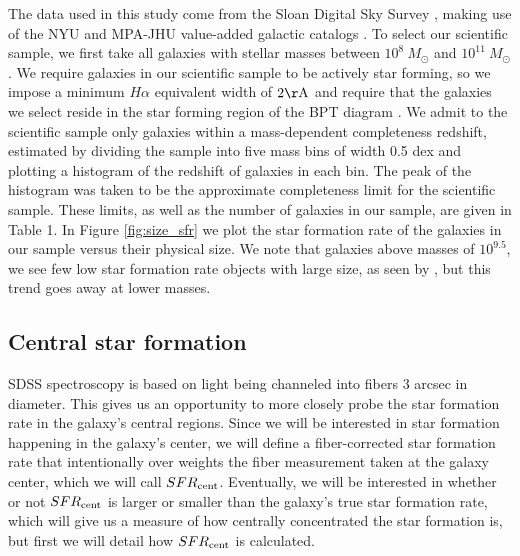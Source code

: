 \documentclass[iop]{emulateapj}
\begin{document}
The data used in this study come from the Sloan Digital Sky Survey \citep[SDSS,][]{SDSS}, making use of the NYU and MPA-JHU value-added galactic catalogs \citep{Kauffmann03,Brinchmann04,blanton05vagc}. To select our scientific sample, we first take all galaxies with stellar masses between $10^{8}\ M_{\odot}$ and $10^{11}\ M_{\odot}$. We require galaxies in our scientific sample to be actively star forming, so we impose a minimum $H\alpha$ equivalent width of $2 \rm \AA$ and require that the galaxies we select reside in the star forming region of the BPT diagram \citep{BPT}. We admit to the scientific sample only galaxies within a mass-dependent completeness redshift, estimated by dividing the sample into five mass bins of width 0.5 dex and plotting a histogram of the redshift of galaxies in each bin. The peak of the histogram was taken to be the approximate completeness limit for the scientific sample. These limits, as well as the number of galaxies in our sample, are given in Table 1. In Figure \ref{fig:size_sfr} we plot the star formation rate of the galaxies in our sample versus their physical size. We note that galaxies above masses of $10^{9.5}$, we see few low star formation rate objects with large size, as seen by \citet{Patel18}, but this trend goes away at lower masses.


\subsection{Central star formation}
\label{sec:fibercor}
SDSS spectroscopy is based on light being channeled into fibers $3$ arcsec in diameter. This gives us an opportunity to more closely probe the star formation rate in the galaxy's central regions. Since we will be interested in star formation happening in the galaxy's center, we will define a fiber-corrected star formation rate that intentionally over weights the fiber measurement taken at the galaxy center, which we will call $SFR_{\rm cent}$. Eventually, we will be interested in whether or not $SFR_{\rm cent}$ is larger or smaller than the galaxy's true star formation rate, which will give us a measure of how centrally concentrated the star formation is, but first we will detail how $SFR_{\rm cent}$ is calculated.
\end{document}
